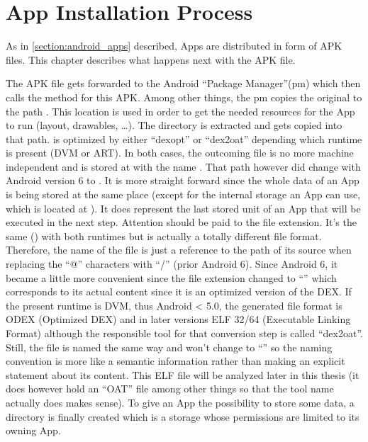 \section{App Installation Process}\label{section:app_installation}
As in \autoref{section:android_apps} described, Apps are distributed
in form of APK files. This chapter describes what happens next with
the APK file.

The APK file gets forwarded to the Android ``Package Manager''(pm)
which then calls the  method for this
APK. Among other things, the pm copies the original 
to the path .
This location is used in order to get the
needed resources for the App to run (layout, drawables, \ldots).
The  directory is extracted and gets copied
into that path.  is optimized by either ``dexopt''
or ``dex2oat'' depending which runtime is present (DVM or ART).
In both cases, the outcoming file is no more machine independent
and is stored at  with the name
.
That path however did change with Android version 6 to
. It
is more straight forward since the whole data of an App is being
stored at the same place (except for the internal storage an App can
use, which is located at ).
It does represent the last stored unit of an App that will be executed in the next step.
Attention should be paid to the file extension.
It's the same () with both runtimes but is actually a totally
different file format.
Therefore, the name of the file is just a reference to the path
of its source when replacing the ``@'' characters with ``/'' (prior Android 6).
Since Android 6, it became a little more convenient since the file extension changed to ``'' which corresponds to its actual content since it is
an optimized version of the DEX.
If the present runtime is DVM, thus Android < 5.0, the generated
file format is ODEX (Optimized DEX) and in later versions
ELF 32/64 (Executable Linking Format) although the responsible
tool for that conversion step is called ``dex2oat''. Still, the file
is named the same way and won't change to ``'' so the naming
convention is more like a semantic information rather than making an
explicit statement about its content.
This ELF file will be analyzed later in this thesis
(it does however hold an ``OAT'' file among other things so that
the tool name actually does makes sense).
To give an App the possibility to
store some data, a  directory is
finally created which is a storage whose permissions are limited to its owning
App.

